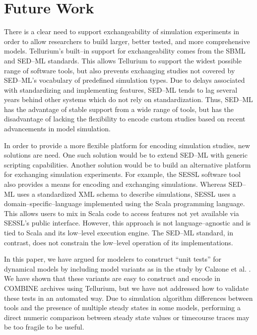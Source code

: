 \documentclass[10pt,letterpaper]{article}
\begin{document}
\section*{Future Work}

There is a clear need to support exchangeability of simulation experiments in order to allow researchers to build larger, better tested, and more comprehensive models. Tellurium's built--in support for exchangeability comes from the SBML and SED--ML standards. This allows Tellurium to support the widest possible range of software tools, but also prevents exchanging studies not covered by SED--ML's vocabulary of predefined simulation types. Due to delays associated with standardizing and implementing features, SED--ML tends to lag several years behind other systems which do not rely on standardization. Thus, SED--ML has the advantage of stable support from a wide range of tools, but has the disadvantage of lacking the flexibility to encode custom studies based on recent advancements in model simulation.

In order to provide a more flexible platform for encoding simulation studies, new solutions are need. One such solution would be to extend SED--ML with generic scripting capabilities. Another solution would be to build an alternative platform for exchanging simulation experiments. For example, the SESSL \cite{ewald2014sessl} software tool also provides a means for encoding and exchanging simulations. Whereas SED--ML uses a standardized XML schema to describe simulations, SESSL uses a domain--specific--language implemented using the Scala programming language. This allows users to mix in Scala code to access features not yet available via SESSL's public interface. However, this approach is not language--agnostic and is tied to Scala and its low--level execution engine. The SED--ML standard, in contrast, does not constrain the low--level operation of its implementations.

In this paper, we have argued for modelers to construct ``unit tests'' for dynamical models by including model variants as in the study by Calzone et al. \cite{calzone2007dynamical}. We have shown that these variants are easy to construct and encode in COMBINE archives using Tellurium, but we have not addressed how to validate these tests in an automated way. Due to simulation algorithm differences between tools and the presence of multiple steady states in some models, performing a direct numeric comparison between steady state values or timecourse traces may be too fragile to be useful.
\end{document}
